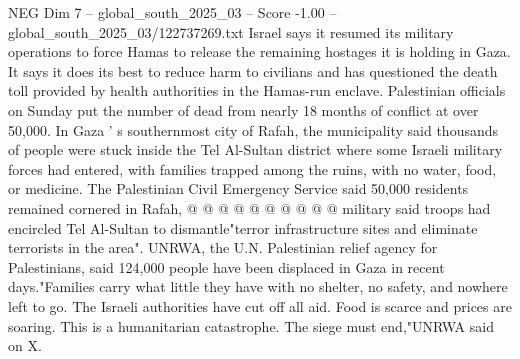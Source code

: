\begin{textsample}{NEG Dim 7 – global\_south\_2025\_03 – Score -1.00 – global\_south\_2025\_03/122737269.txt}
Israel says it resumed its military operations to force Hamas to release the remaining hostages it is holding in Gaza.
It says it does its best to reduce harm to civilians and has questioned the death toll provided by health authorities in the Hamas-run enclave.
Palestinian officials on Sunday put the number of dead from nearly 18 months of conflict at over 50,000.
In Gaza ' s southernmost city of Rafah, the municipality said thousands of people were stuck inside the Tel Al-Sultan district where some Israeli military forces had entered, with families trapped among the ruins, with no water, food, or medicine.
The Palestinian Civil Emergency Service said 50,000 residents remained cornered in Rafah, @ @ @ @ @ @ @ @ @ @ military said troops had encircled Tel Al-Sultan to dismantle"terror infrastructure sites and eliminate terrorists in the area".
UNRWA, the U.N.
Palestinian relief agency for Palestinians, said 124,000 people have been displaced in Gaza in recent days."Families carry what little they have with no shelter, no safety, and nowhere left to go.
The Israeli authorities have cut off all aid.
Food is scarce and prices are soaring.
This is a humanitarian catastrophe.
The siege must end,"UNRWA said on X.

\end{textsample}
